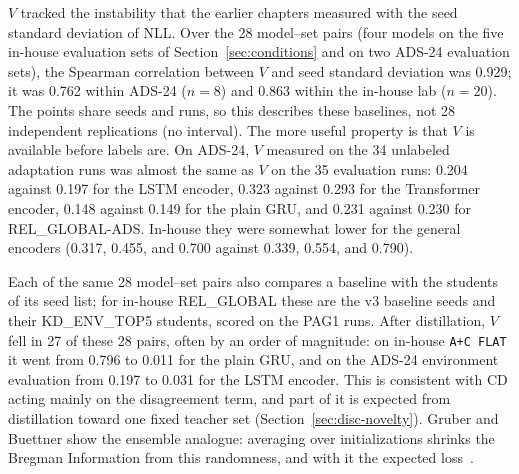 $V$ tracked the instability that the earlier chapters measured with the
seed standard deviation of NLL. Over the 28 model--set pairs (four
models on the five in-house evaluation sets of
Section~\ref{sec:conditions} and on two ADS-24 evaluation sets), the
Spearman correlation between $V$ and seed standard
deviation was 0.929; it was 0.762 within ADS-24 ($n=8$) and 0.863 within
the in-house lab ($n=20$). The points share seeds and runs, so this
describes these baselines, not 28 independent replications (no interval). The more useful property is that $V$ is available before
labels are. On ADS-24, $V$ measured on the 34 unlabeled adaptation runs
was almost the same as $V$ on the 35 evaluation runs: 0.204 against
0.197 for the LSTM encoder, 0.323 against 0.293 for the Transformer
encoder, 0.148 against 0.149 for the plain GRU, and 0.231 against 0.230
for REL\_GLOBAL-ADS. In-house they were somewhat lower for the general
encoders (0.317, 0.455, and 0.700 against 0.339, 0.554, and 0.790).

Each of the same 28 model--set pairs also compares a baseline with the
students of its seed list; for in-house REL\_GLOBAL these are the v3
baseline seeds and their KD\_ENV\_TOP5 students, scored on the PAG1 runs. After distillation, $V$ fell in 27 of these 28 pairs, often by an order
of magnitude: on in-house \texttt{A+C FLAT} it went from 0.796 to 0.011
for the plain GRU, and on the ADS-24 environment evaluation from 0.197
to 0.031 for the LSTM encoder. This is consistent with CD acting
mainly on the disagreement term, and part of it is expected from
distillation toward one fixed teacher set
(Section~\ref{sec:disc-novelty}). Gruber and Buettner show the
ensemble analogue: averaging over initializations shrinks the Bregman
Information from this randomness, and with it the expected
loss~\cite{gruber2022uncertainty}.

